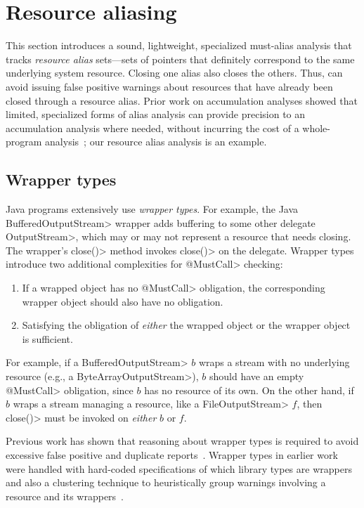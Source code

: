\section{Resource aliasing}
\label{sec:must-call-choice}

This section introduces a sound, lightweight, specialized must-alias analysis
that tracks \emph{resource alias} sets---sets of pointers that
definitely correspond to the same underlying system resource.  Closing
one alias also closes the others.  Thus,
\Tool can avoid issuing false positive warnings about resources
that have already been closed through a resource alias.  Prior
work on accumulation analyses showed that limited, specialized forms
of alias analysis can provide precision to an accumulation analysis
where needed, without incurring the cost of a whole-program
analysis~\cite{KelloggRSSE2020}; our resource alias analysis is an
example.

\subsection{Wrapper types}

Java programs extensively use \emph{wrapper types}.  For example, the Java
\<BufferedOutputStream> wrapper adds buffering to some other delegate \<OutputStream>, which
may or may not represent a resource that needs closing.  The wrapper's 
\<close()> method invokes \<close()> on the delegate.
Wrapper types
introduce two additional complexities for \<@MustCall> checking:
\begin{enumerate}
  \item If a wrapped object has no \<@MustCall> obligation, the corresponding
  wrapper object should also have no obligation.
  \item Satisfying the obligation of \emph{either} the wrapped object or the
  wrapper object is sufficient.
\end{enumerate}
For example, if a \<BufferedOutputStream> $b$ wraps a stream with no underlying
resource (e.g., a \<ByteArrayOutputStream>), $b$ should have an empty
\<@MustCall> obligation, since $b$ has no resource of its own.  On the other
hand, if $b$ wraps a stream managing a resource, like a \<FileOutputStream> $f$,
then \<close()> must be invoked on \emph{either} $b$ or $f$.

Previous work has shown that reasoning about wrapper types is
required to avoid excessive false positive and duplicate
reports~\cite{TorlakC10,ecj-resource-leak}.  Wrapper types in earlier
work were handled with hard-coded specifications of which library
types are wrappers and also a clustering technique to heuristically group warnings
involving a resource and its wrappers~\cite{TorlakC10}.  

